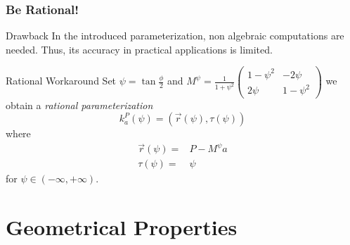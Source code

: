 \documentclass[ucs,9pt,pagenumbers]{beamer}
\begin{document}
\begin{frame}
  \frametitle{Be Rational!}
  \begin{block}{Drawback}
    In the introduced parameterization, non algebraic computations are
    needed. Thus, its accuracy in practical applications is limited.
  \end{block}
  \begin{block}{Rational Workaround}
    Set \(\psi=\tan \frac{\phi}{2}\) and %
    \(
    M^\psi = \frac{1}{1+\psi^2}\begin{pmatrix}
      1-\psi^2 & -2 \psi \\
      2\psi & 1-\psi^2
    \end{pmatrix}
    \) %
    we obtain a \emph{rational parameterization}
    \[
    k^P_a(\psi) = \left( \vec{r}(\psi),\tau(\psi)\right)
    \]
    where
    \begin{align*}
      \vec{r}(\psi) = & P - M^\psi a\\
      \tau(\psi) = & \psi
    \end{align*}
for \(\psi\in (-\infty,+\infty)\).
  \end{block}
\end{frame}

\section{Geometrical Properties}
\end{document}
